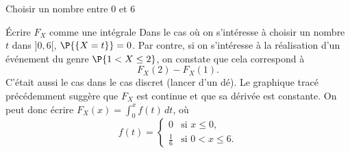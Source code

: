 \documentclass[nuit,charter,pied]{BeamerJS}
\begin{document}
\begin{frame}{Choisir un nombre entre 0 et 6}
\begin{center}
\end{center}
\end{frame}

\begin{frame}{Écrire $F_X$ comme une intégrale}
	Dans le cas où on s'intéresse à choisir un nombre $t$ dans $]0,6[$, $\P{\{X=t\}}=0$. Par contre, si on s'intéresse à la réalisation d'un événement du genre $\P{1<X\leq 2}$, on constate que cela correspond à \[F_X(2)-F_X(1).\]
	C'était aussi le cas dans le cas discret (lancer d'un dé). Le graphique tracé précédemment suggère que $F_X$ est continue et que sa dérivée est constante. On peut donc écrire $F_X(x)=\int_0^x f(t)\,dt$, où
	\[f(t)=\begin{cases}
		0&\text{si $x\leq 0$},\\
		\frac{1}{6}&\text{si $0<x\leq 6$}.
	\end{cases}\]
\end{frame}
\end{document}
